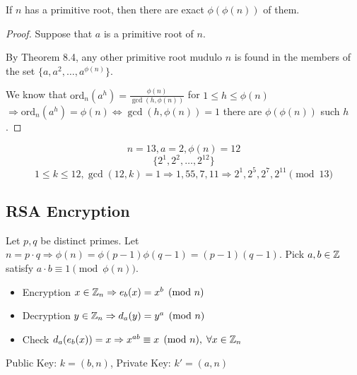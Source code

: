 \begin{corollary}
    If $n$ has a primitive root, then there are exact $\phi(\phi(n))$ of them.
\end{corollary}
\begin{proof}
    Suppose that $a$ is a primitive root of $n$.

    By Theorem 8.4, any other primitive root mudulo $n$ is found in the members of the set 
    $\{a, a^2, \dots, a^{\phi(n)}\}$.

     We know that $\text{ord}_n(a^h) = \frac{\phi(n)}{\gcd(h, \phi(n))}$ for $1 \leq h \leq \phi(n)$
     $\Rightarrow \text{ord}_n(a^h) = \phi(n) \iff \gcd(h, \phi(n)) = 1$
    there are $\phi(\phi(n))$ such $h$.
\end{proof}
\begin{eg}
    \[
        n=13, a=2, \phi(n) = 12
    \]
    \[
        \{2^1, 2^2, \dots, 2^{12}\}
    \]
    \[
        1 \leq k \leq 12, \gcd(12, k) = 1 \Rightarrow 1, 55, 7, 11 \Rightarrow 2^1, 2^5, 2^7, 2^{11} \pmod {13}
    \]
\end{eg}


\subsection*{RSA Encryption}

Let $p, q$ be distinct primes.
Let $n = p \cdot q \Rightarrow \phi(n) = \phi(p - 1)\phi(q - 1) = (p - 1)(q - 1)$.\newline
Pick $a, b \in \mathbb{Z}$ satisfy $a \cdot b \equiv 1 \pmod{\phi(n)}$.

\begin{itemize}
    \item Encryption\newline
    $x \in \mathbb{Z}_n \Rightarrow e_b(x) = x^b \pmod n$
    
    \item Decryption\newline
    $y \in \mathbb{Z}_n \Rightarrow d_a(y) = y^a \pmod n$

    \item Check\newline
    $d_a(e_b(x)) = x \Rightarrow x^{ab} \equiv x \pmod n, \;\forall x \in \mathbb{Z}_n$
    
\end{itemize}


Public Key: $k = (b, n)$,
Private Key: $k\prime = (a, n)$

